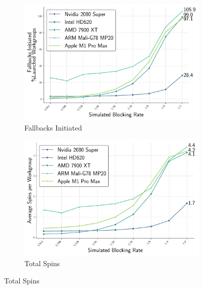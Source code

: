 \documentclass[sigconf]{acmart}
\begin{document}
\begin{figure}[t]
  \centering
  \begin{subfigure}[t]{0.48\linewidth}
    \centering
    \includegraphics[width=\linewidth]{graphics/fallbacksInitiated_plot.pdf}
    \caption{Fallbacks Initiated}
    \label{fig:fallbacks_initiated}
  \end{subfigure}\hfill
  \begin{subfigure}[t]{0.48\linewidth}
    \centering
    \includegraphics[width=\linewidth]{graphics/totalSpins_plot.pdf}
    \caption{Total Spins}
    \label{fig:total_spins}
  \end{subfigure}

  \vspace{0.2em}


\end{figure}
\end{document}
